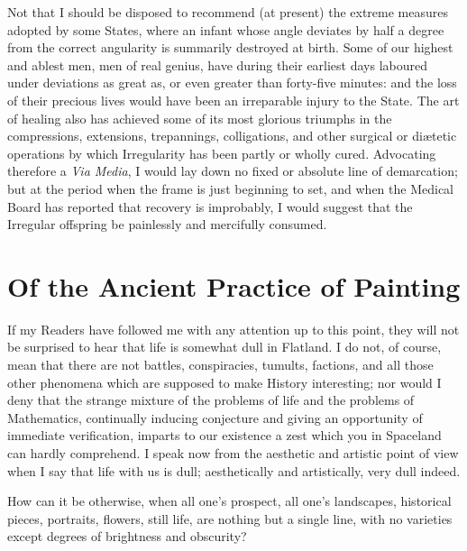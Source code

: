 \documentclass[10pt, kindle, oneside]{kindle}
\begin{document}
Not that I should be disposed to recommend (at present) the extreme measures
adopted by some States, where an infant whose angle deviates by half a degree
from the correct angularity is summarily destroyed at birth.  Some of our
highest and ablest men, men of real genius, have during their earliest days
laboured under deviations as great as, or even greater than forty-five
minutes: and the loss of their precious lives would have been an irreparable
injury to the State. The art of healing also has achieved some of its most
glorious triumphs in the compressions, extensions, trepannings, colligations,
and other surgical or di{\ae}tetic operations by which Irregularity has been
partly or wholly cured. Advocating therefore a \emph{Via Media}, I would lay down no
fixed or absolute line of demarcation; but at the period when the frame is
just beginning to set, and when the Medical Board has reported that recovery
is improbably, I would suggest that the Irregular offspring be painlessly and
mercifully consumed.


\chapter{Of the Ancient Practice of Painting}


If my Readers have followed me with any attention up to this point, they will
not be surprised to hear that life is somewhat dull in Flatland. I do not, of
course, mean that there are not battles, conspiracies, tumults, factions, and
all those other phenomena which are supposed to make History interesting; nor
would I deny that the strange mixture of the problems of life and the problems
of Mathematics, continually inducing conjecture and giving an opportunity of
immediate verification, imparts to our existence a zest which you in Spaceland
can hardly comprehend. I speak now from the aesthetic and artistic point of
view when I say that life with us is dull; aesthetically and artistically,
very dull indeed.

How can it be otherwise, when all one's prospect, all one's landscapes,
historical pieces, portraits, flowers, still life, are nothing but a single
line, with no varieties except degrees of brightness and obscurity?
\end{document}
